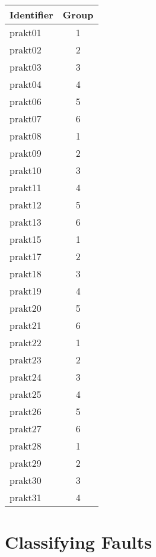 \begin{center}

\begin{tabular}{|l|c|}
\hline
\bf Identifier &  \bf Group \\
\hline
prakt01       &      1      \\
prakt02       &      2      \\
prakt03       &      3      \\
prakt04       &      4      \\
prakt06       &      5      \\
\hline
prakt07       &      6      \\
prakt08       &      1      \\
prakt09       &      2      \\
prakt10       &      3      \\
prakt11       &      4      \\
\hline
prakt12       &      5      \\
prakt13       &      6      \\
prakt15       &      1      \\
prakt17       &      2      \\
prakt18       &      3      \\
\hline
prakt19       &      4      \\
prakt20       &      5      \\
prakt21       &      6      \\
prakt22       &      1      \\
prakt23       &      2      \\
\hline
prakt24       &      3      \\
prakt25       &      4      \\
prakt26       &      5      \\
prakt27       &      6      \\
prakt28       &      1      \\
\hline
prakt29       &      2      \\
prakt30       &      3      \\
prakt31       &      4      \\
\hline
\end{tabular}

\end{center}

\newpage

\section*{Classifying Faults}

